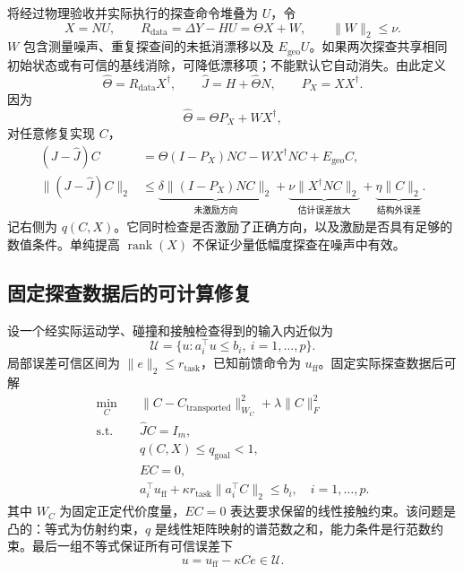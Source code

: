 \documentclass[11pt,a4paper]{article}
\numberwithin{equation}{section}
\theoremstyle{definition}
\begin{document}
将经过物理验收并实际执行的探查命令堆叠为 $U$，令
\begin{equation}
  X=NU,\qquad
  R_{\mathrm{data}}=\Delta Y-HU=\Theta X+W,
  \qquad\|W\|_2\le\nu .
  \label{eq:cal-data}
\end{equation}
$W$ 包含测量噪声、重复探查间的未抵消漂移以及 $E_{\mathrm{geo}}U$。如果两次探查共享相同初始状态或有可信的基线消除，可降低漂移项；不能默认它自动消失。由此定义
\begin{equation}
  \widehat\Theta=R_{\mathrm{data}}X^\dagger,
  \qquad
  \widehat J=H+\widehat\Theta N,
  \qquad P_X=XX^\dagger .
  \label{eq:cal-estimate}
\end{equation}
因为
\begin{equation}
  \widehat\Theta
  =\Theta P_X+WX^\dagger,
\end{equation}
对任意修复实现 $C$，
\begin{align}
  (J-\widehat J)C
  &=
  \Theta(I-P_X)NC
  -WX^\dagger NC+E_{\mathrm{geo}}C,\\
  \|(J-\widehat J)C\|_2
  &\le
  \underbrace{
  \delta\|(I-P_X)NC\|_2}_{\text{未激励方向}}
  +
  \underbrace{
  \nu\|X^\dagger NC\|_2}_{\text{估计误差放大}}
  +
  \underbrace{
  \eta\|C\|_2}_{\text{结构外误差}} .
  \label{eq:cal-q}
\end{align}
记右侧为 $q(C,X)$。它同时检查是否激励了正确方向，以及激励是否具有足够的数值条件。单纯提高 $\operatorname{rank}(X)$ 不保证少量低幅度探查在噪声中有效。

\subsection{固定探查数据后的可计算修复}

设一个经实际运动学、碰撞和接触检查得到的输入内近似为
\begin{equation}
  \mathcal U=
  \{u:a_i^\top u\le b_i,\ i=1,\ldots,p\}.
\end{equation}
局部误差可信区间为 $\|e\|_2\le r_{\mathrm{task}}$，已知前馈命令为 $u_{\mathrm{ff}}$。固定实际探查数据后可解
\begin{equation}
\begin{aligned}
  \min_C\quad&
  \|C-C_{\mathrm{transported}}\|_{W_C}^2+
  \lambda\|C\|_F^2\\
  \text{s.t.}\quad&
  \widehat JC=I_m,\\
  &q(C,X)\le q_{\mathrm{goal}}<1,\\
  &EC=0,\\
  &a_i^\top u_{\mathrm{ff}}
   +\kappa r_{\mathrm{task}}\|a_i^\top C\|_2
   \le b_i,\quad i=1,\ldots,p.
\end{aligned}
\label{eq:cal-convex-repair}
\end{equation}
其中 $W_C$ 为固定正定代价度量，$EC=0$ 表达要求保留的线性接触约束。该问题是凸的：等式为仿射约束，$q$ 是线性矩阵映射的谱范数之和，能力条件是行范数约束。最后一组不等式保证所有可信误差下
\begin{equation}
  u=u_{\mathrm{ff}}-\kappa Ce\in\mathcal U .
\end{equation}
\end{document}
